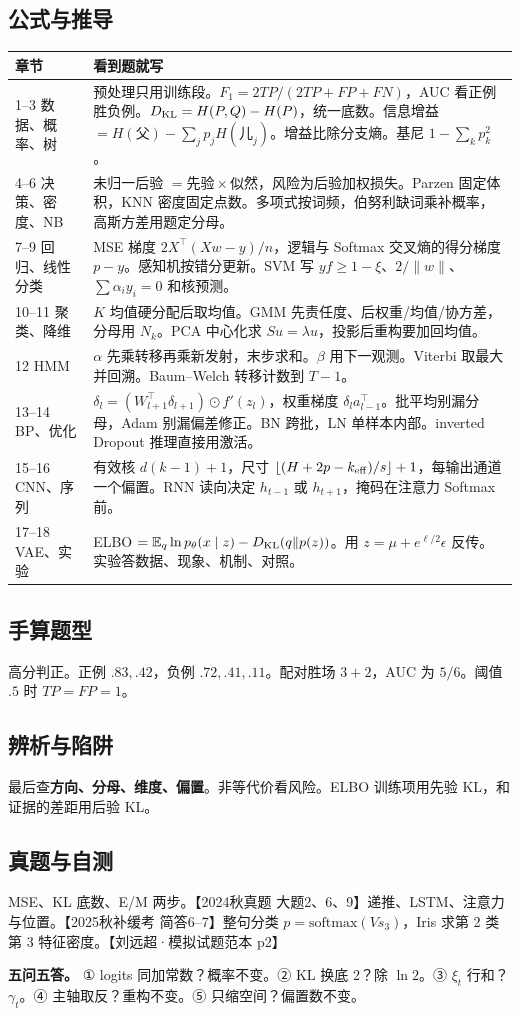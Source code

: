 \documentclass[UTF8,a4paper,zihao=-4,fontset=fandol]{ctexart}
\renewcommand{\arraystretch}{1.10}
\begin{document}
\subsection{公式与推导}
{
\small
\renewcommand{\arraystretch}{1.05}
\begin{tabularx}{\linewidth}{@{}p{.18\linewidth}X@{}}
\toprule
章节 & 看到题就写\\
\midrule
1–3 数据、概率、树 & 预处理只用训练段。$F_1=2TP/(2TP+FP+FN)$，AUC 看正例胜负例。$D_{\rm KL}=H(P,Q)-H(P)$，统一底数。信息增益 $=H(\text{父})-\sum_j p_jH(\text{儿}_j)$。增益比除分支熵。基尼 $1-\sum_kp_k^2$。\\
4–6 决策、密度、NB & 未归一后验 $=\text{先验}\times\text{似然}$，风险为后验加权损失。Parzen 固定体积，KNN 密度固定点数。多项式按词频，伯努利缺词乘补概率，高斯方差用题定分母。\\
7–9 回归、线性分类 & MSE 梯度 $2X^\top(Xw-y)/n$，逻辑与 Softmax 交叉熵的得分梯度 $p-y$。感知机按错分更新。SVM 写 $yf\ge1-\xi$、$2/\|w\|$、$\sum\alpha_i y_i=0$ 和核预测。\\
10–11 聚类、降维 & $K$ 均值硬分配后取均值。GMM 先责任度、后权重/均值/协方差，分母用 $N_k$。PCA 中心化求 $Su=\lambda u$，投影后重构要加回均值。\\
12 HMM & $\alpha$ 先乘转移再乘新发射，末步求和。$\beta$ 用下一观测。Viterbi 取最大并回溯。Baum–Welch 转移计数到 $T-1$。\\
13–14 BP、优化 & $\delta_l=(W_{l+1}^\top\delta_{l+1})\odot f'(z_l)$，权重梯度 $\delta_l a_{l-1}^\top$。批平均别漏分母，Adam 别漏偏差修正。BN 跨批，LN 单样本内部。inverted Dropout 推理直接用激活。\\
15–16 CNN、序列 & 有效核 $d(k-1)+1$，尺寸 $\lfloor(H+2p-k_{\rm eff})/s\rfloor+1$，每输出通道一个偏置。RNN 读向决定 $h_{t-1}$ 或 $h_{t+1}$，掩码在注意力 Softmax 前。\\
17–18 VAE、实验 & ELBO $=\mathbb E_q\ln p_\theta(x\mid z)-D_{\rm KL}(q\Vert p(z))$。用 $z=\mu+e^{\ell/2}\epsilon$ 反传。实验答数据、现象、机制、对照。\\
\bottomrule
\end{tabularx}
}

\subsection{手算题型}
高分判正。正例 $.83,.42$，负例 $.72,.41,.11$。配对胜场 $3+2$，AUC 为 $5/6$。阈值 $.5$ 时 $TP=FP=1$。

\subsection{辨析与陷阱}
最后查\textbf{方向、分母、维度、偏置}。非等代价看风险。ELBO 训练项用先验 KL，和证据的差距用后验 KL。

\subsection{真题与自测}
MSE、KL 底数、E/M 两步。【2024秋真题 大题2、6、9】递推、LSTM、注意力与位置。【2025秋补缓考 简答6–7】整句分类 $p=\mathrm{softmax}(Vs_3)$，Iris 求第 2 类第 3 特征密度。【刘远超·模拟试题范本 p2】

\textbf{五问五答。} ① logits 同加常数？概率不变。② KL 换底 2？除 $\ln2$。③ $\xi_t$ 行和？$\gamma_t$。④ 主轴取反？重构不变。⑤ 只缩空间？偏置数不变。
\end{document}
